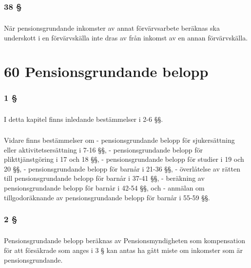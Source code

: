 \documentclass[a4paper,notitlepage,openany,10pt]{book}
\begin{document}
\subsection*{38 §}
\paragraph*{}
När pensionsgrundande inkomster av annat förvärvsarbete beräknas ska underskott i en förvärvskälla inte dras av från inkomst av en annan förvärvskälla.
\chapter*{60 Pensionsgrundande belopp}
\subsection*{1 §}
\paragraph*{}
I detta kapitel finns inledande bestämmelser i 2-6 §§.
\paragraph*{}
Vidare finns bestämmelser om
\newline - pensionsgrundande belopp för sjukersättning eller aktivitetsersättning i 7-16 §§,
\newline - pensionsgrundande belopp för plikttjänstgöring i 17 och 18 §§,
\newline - pensionsgrundande belopp för studier i 19 och 20 §§,
\newline - pensionsgrundande belopp för barnår i 21-36 §§,
\newline - överlåtelse av rätten till pensionsgrundande belopp för barnår i 37-41 §§,
\newline - beräkning av pensionsgrundande belopp för barnår i 42-54 §§, och
\newline - anmälan om tillgodoräknande av pensionsgrundande belopp för barnår i 55-59 §§.
\subsection*{2 §}
\paragraph*{}
Pensionsgrundande belopp beräknas av Pensionsmyndigheten som kompensation för att försäkrade som anges i 3 § kan antas ha gått miste om inkomster som är pensionsgrundande.
\end{document}
